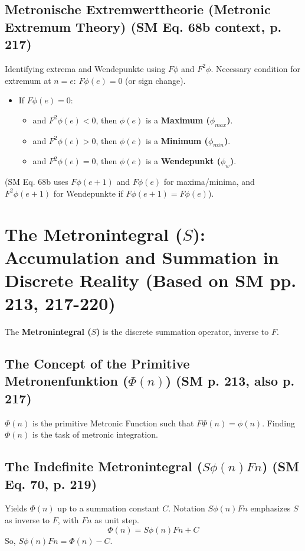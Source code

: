 \documentclass[
    12pt,              %
    a4paper,           %
    headings=normal,   %
    twoside=true,      %
    BCOR=8mm,          %
]{scrbook}
\newcommand{\metrondifferential}{F}
\newcommand{\metronintegral}{S}
\newcommand{\metronenziffer}{n}
\begin{document}
\subsection{Metronische Extremwerttheorie (Metronic Extremum Theory) (SM Eq. 68b context, p. 217)}
\label{sec:ch10_2_5_extremwerttheorie}
Identifying extrema and Wendepunkte using \(F\phi\) and \(F^2\phi\).
Necessary condition for extremum at \(n=e\): \(F\phi(e)=0\) (or sign change).
\begin{itemize}
    \item   If \(F\phi(e)=0\):
        \begin{itemize}
            \item   and \(F^2\phi(e) < 0\), then \(\phi(e)\) is a \textbf{Maximum (\(\phi_{max}\))}.
            \item   and \(F^2\phi(e) > 0\), then \(\phi(e)\) is a \textbf{Minimum (\(\phi_{min}\))}.
            \item   and \(F^2\phi(e) = 0\), then \(\phi(e)\) is a \textbf{Wendepunkt (\(\phi_w\))}.
        \end{itemize}
\end{itemize}
(SM Eq. 68b uses \(F\phi(e+1)\) and \(F\phi(e)\) for maxima/minima, and \(F^2\phi(e+1)\) for Wendepunkte if \(F\phi(e+1) = F\phi(e)\)).

\section{The Metronintegral (\(\metronintegral\)): Accumulation and Summation in Discrete Reality (Based on SM pp. 213, 217-220)}
\label{sec:ch10_3_metronintegral}

The \textbf{Metronintegral (\(\metronintegral\))} is the discrete summation operator, inverse to \(\metrondifferential\).

\subsection{The Concept of the Primitive Metronenfunktion (\(\Phi(n)\)) (SM p. 213, also p. 217)}
\label{sec:ch10_3_1_primitive_metronenfunktion}
\(\Phi(n)\) is the primitive Metronic Function such that \(F\Phi(n) = \phi(n)\). Finding \(\Phi(n)\) is the task of metronic integration.

\subsection{The Indefinite Metronintegral (\(S\phi(n)Fn\)) (SM Eq. 70, p. 219)}
\label{sec:ch10_3_2_indefinite_metronintegral}
Yields \(\Phi(n)\) up to a summation constant \(C\). Notation \(S\phi(n)Fn\) emphasizes \(S\) as inverse to \(F\), with \(Fn\) as unit step.
\begin{equation} \label{eq:original_indefinite_metronintegral} %
\Phi(\metronenziffer) = \metronintegral \phi(\metronenziffer) F\metronenziffer + C
\end{equation}
So, \(S\phi(n)Fn = \Phi(n) - C\).
\end{document}
